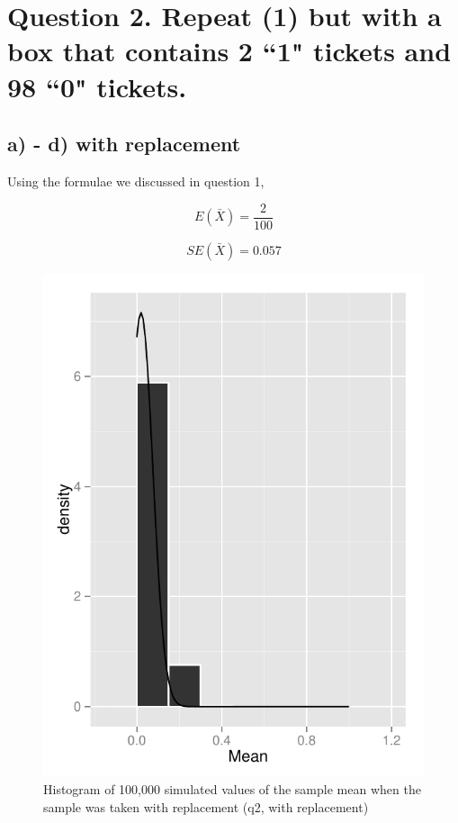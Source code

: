 \documentclass[11pt]{article}
\begin{document}
\newpage

 \section*{Question 2. Repeat (1) but with a box that contains 2 ``1" tickets and 98 ``0" tickets.}
 
 \subsection*{a) - d) with replacement}
Using the formulae we discussed in question 1,

$$E(\bar{X})= \frac{2}{100}$$ 
 
 $$SE(\bar{X}) = 0.057$$
 


 
\begin{figure}
\centering
\includegraphics{histogram_2c-1.pdf}
\caption{Histogram of 100,000 simulated values of the sample mean when the sample was taken with replacement (q2, with replacement)}\label{q2}
\end{figure}
 
\end{document}
